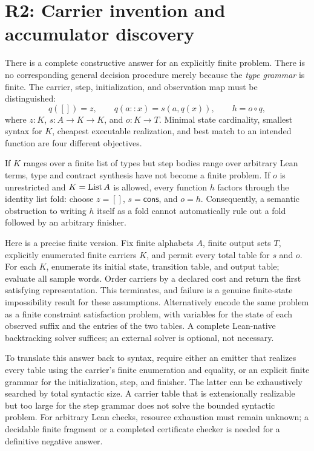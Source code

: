 \section{R2: Carrier invention and accumulator discovery}\label{sec:carriers}


\answer There is a complete constructive answer for an explicitly finite problem. There is no corresponding general decision procedure merely because the \emph{type grammar} is finite. The carrier, step, initialization, and observation map must be distinguished:
\begin{equation}\label{eq:fold-factor}
 q([])=z,\qquad q(a::x)=s(a,q(x)),\qquad h=o\circ q,
\end{equation}
where $z:K$, $s:A\to K\to K$, and $o:K\to T$. Minimal state cardinality, smallest syntax for $K$, cheapest executable realization, and best match to an intended function are four different objectives.

If $K$ ranges over a finite list of types but step bodies range over arbitrary Lean terms, type and contract synthesis have not become a finite problem. If $o$ is unrestricted and $K=\operatorname{List} A$ is allowed, every function $h$ factors through the identity list fold: choose $z=[]$, $s=\mathsf{cons}$, and $o=h$. Consequently, a semantic obstruction to writing $h$ itself as a fold cannot automatically rule out a fold followed by an arbitrary finisher.

Here is a precise finite version. Fix finite alphabets $A$, finite output sets $T$, explicitly enumerated finite carriers $K$, and permit every total table for $s$ and $o$. For each $K$, enumerate its initial state, transition table, and output table; evaluate all sample words. Order carriers by a declared cost and return the first satisfying representation. This terminates, and failure is a genuine finite-state impossibility result for these assumptions. Alternatively encode the same problem as a finite constraint satisfaction problem, with variables for the state of each observed suffix and the entries of the two tables. A complete Lean-native backtracking solver suffices; an external solver is optional, not necessary.

To translate this answer back to syntax, require either an emitter that realizes every table using the carrier's finite enumeration and equality, or an explicit finite grammar for the initialization, step, and finisher. The latter can be exhaustively searched by total syntactic size. A carrier table that is extensionally realizable but too large for the step grammar does not solve the bounded syntactic problem. For arbitrary Lean checks, resource exhaustion must remain unknown; a decidable finite fragment or a completed certificate checker is needed for a definitive negative answer.

